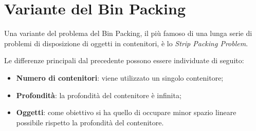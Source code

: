 \section{Variante del Bin Packing}
Una variante del problema del Bin Packing, il più famoso di una lunga serie di problemi di disposizione di oggetti in contenitori, è lo \textit{Strip Packing Problem}.

Le differenze principali dal precedente possono essere individuate di seguito:
\begin{itemize}
	\item \textbf{Numero di contenitori}: viene utilizzato un singolo contenitore;
	\item \textbf{Profondità}: la profondità del contenitore è infinita;
	\item \textbf{Oggetti}: come obiettivo si ha quello di occupare minor spazio lineare possibile rispetto la profondità del contenitore.
\end{itemize}
